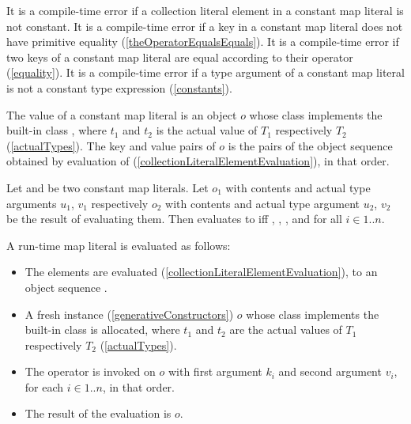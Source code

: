 \documentclass[makeidx]{article}
\begin{document}
{\LMHash{}%
It is a compile-time error
if a collection literal element in a constant map literal is not constant.
It is a compile-time error if
a key in a constant map literal
does not have primitive equality
(\ref{theOperatorEqualsEquals}).
It is a compile-time error if two keys of a constant map literal are equal
according to their \lit{==} operator
(\ref{equality}).
It is a compile-time error if a type argument of a constant map literal
is not a constant type expression
(\ref{constants}).


\LMHash{}%
The value of a constant map literal
is an object $o$ whose class implements the built-in class
,
where $t_1$ and $t_2$ is the actual value of $T_1$ respectively $T_2$
(\ref{actualTypes}).
The key and value pairs of $o$ is
the pairs of the object sequence  obtained by
evaluation of 
(\ref{collectionLiteralElementEvaluation}),
in that order.

\LMHash{}%
Let 
and 
be two constant map literals.
Let $o_1$ with contents 
and actual type arguments $u_1$, $v_1$
respectively
$o_2$ with contents 
and actual type argument $u_2$, $v_2$
be the result of evaluating them.
Then  evaluates to \TRUE{} if{}f
, ,
, and
for all $i \in 1 .. n$.


\LMHash{}%
A run-time map literal
is evaluated as follows:

\begin{itemize}
\item
  The elements  are evaluated
  (\ref{collectionLiteralElementEvaluation}),
  to an object sequence .
\item
  A fresh instance (\ref{generativeConstructors}) $o$
  whose class implements the built-in class 
  is allocated,
  where $t_1$ and $t_2$ are the actual values of $T_1$ respectively $T_2$
  (\ref{actualTypes}).
\item
  The operator \lit{[]=} is invoked on $o$
  with first argument $k_i$ and second argument $v_i$,
  for each $i \in 1 .. n$, in that order.
\item
  The result of the evaluation is $o$.
\end{itemize}

}
\end{document}
